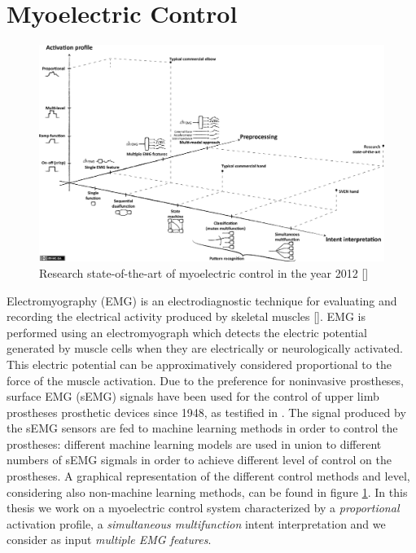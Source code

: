 \section{Myoelectric Control}\label{sec:EMG}
\begin{figure}[ht]
    \centering
    \includegraphics[width=1\textwidth]{Images/myoelectric-control.png}
    \caption{Research state-of-the-art of myoelectric control in the year 2012 [\cite{Fougner2012ControlOU}]}
    \label{fig:myo-control-schema}
\end{figure}
Electromyography (EMG) is an electrodiagnostic technique for evaluating and recording the electrical activity produced by skeletal muscles [\cite{0736093400}]. EMG is performed using an electromyograph which detects the electric potential generated by muscle cells when they are electrically or neurologically activated.
This electric potential can be approximatively considered proportional to the force of the muscle activation.
Due to the preference for noninvasive prostheses, surface EMG (sEMG) signals have been used for the control of upper limb prostheses prosthetic devices since 1948, as testified in \cite{Zecca2002}.
The signal produced by the sEMG sensors are fed to machine learning methods in order to control the prostheses: different machine learning models are used in union to different numbers of sEMG sigmals in order to achieve different level of control on the prostheses. A graphical representation of the different control methods and level, considering also non-machine learning methods, can be found in figure \ref{fig:myo-control-schema}.
In this thesis we work on a myoelectric control system characterized by a \textit{proportional} activation profile, a \textit{simultaneous multifunction} intent interpretation and we consider as input \textit{multiple EMG features}.